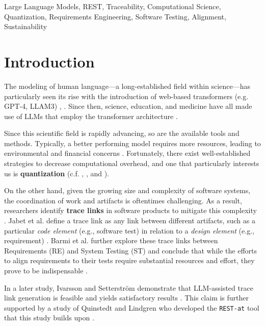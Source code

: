 \documentclass[conference]{IEEEtran}
\begin{document}
\begin{IEEEkeywords}
Large Language Models, REST, Traceability, Computational Science, Quantization,
Requirements Engineering, Software Testing, Alignment, Sustainability
\end{IEEEkeywords}

\section{Introduction}\label{intro}

The modeling of human language---a long-established field within science---has
particularly seen its rise with the introduction of web-based transformers (e.g.
GPT-4, LLAM3) \cite{jones1994Natural}, \cite{vaswani2017Attention}. Since then,
science, education, and medicine have all made use of LLMs that employ the
transformer architecture \cite{naveed2024Comprehensive}.

Since this scientific field is rapidly advancing, so are the available tools and
methods. Typically, a better performing model requires more resources, leading
to environmental and financial concerns \cite{naveed2024Comprehensive}.
Fortunately, there exist well-established strategies to decrease computational
overhead, and one that particularly interests us is \textbf{quantization} (c.f.
\cite{zhu2024Survey}, \cite{lin2024AWQ}, and \cite{chen2024EfficientQAT}).

On the other hand, given the growing size and complexity of software systems,
the coordination of work and artifacts is oftentimes challenging. As a result,
researchers identify \textbf{trace links} in software products to mitigate this
complexity \cite{jaber2013Effect}. Jabet et al. define a trace link as any link
between different artifacts, such as a particular \textit{code element} (e.g.,
software test) in relation to a \textit{design element} (e.g., requirement)
\cite{jaber2013Effect}. Barmi et al. further explore these trace links between
Requirements (RE) and System Testing (ST) and conclude that while the efforts to
align requirements to their tests require substantial resources and effort, they
prove to be indispensable \cite{barmi2011Alignment}.

In a later study, Ivarsson and Setterström demonstrate that LLM-assisted
trace link generation is feasible and yields satisfactory results
\cite{ivarsson2023automated}. This claim is further supported by a study of
Quinstedt and Lindgren who developed the \verb|REST-at| tool that this study
builds upon \cite{quinstedt2024Optimizing}. 
\end{document}
